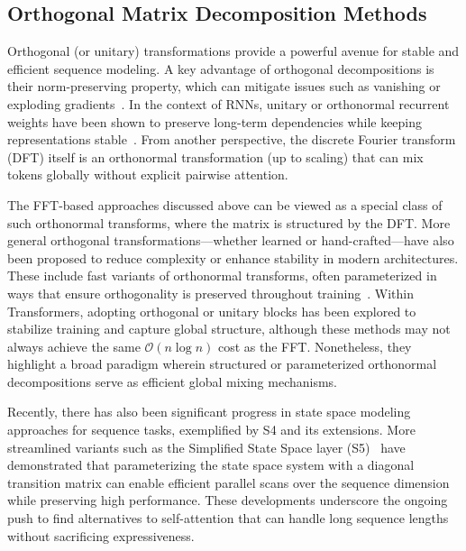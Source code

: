 \subsection{Orthogonal Matrix Decomposition Methods}
\label{subsec:orthogonal_decompositions}
Orthogonal (or unitary) transformations provide a powerful avenue for stable and efficient sequence modeling. A key advantage of orthogonal decompositions is their norm-preserving property, which can mitigate issues such as vanishing or exploding gradients~\cite{wisdom2016full}. In the context of RNNs, unitary or orthonormal recurrent weights have been shown to preserve long-term dependencies while keeping representations stable~\cite{arjovsky2016unitary,lezcano2019cheap}. From another perspective, the discrete Fourier transform (DFT) itself is an orthonormal transformation (up to scaling) that can mix tokens globally without explicit pairwise attention.

The FFT-based approaches discussed above can be viewed as a special class of such orthonormal transforms, where the matrix is structured by the DFT. More general orthogonal transformations---whether learned or hand-crafted---have also been proposed to reduce complexity or enhance stability in modern architectures. These include fast variants of orthonormal transforms, often parameterized in ways that ensure orthogonality is preserved throughout training~\cite{lezcano2019cheap}. Within Transformers, adopting orthogonal or unitary blocks has been explored to stabilize training and capture global structure, although these methods may not always achieve the same \(\mathcal{O}(n \log n)\) cost as the FFT. Nonetheless, they highlight a broad paradigm wherein structured or parameterized orthonormal decompositions serve as efficient global mixing mechanisms.

Recently, there has also been significant progress in state space modeling approaches for sequence tasks, exemplified by S4 and its extensions. More streamlined variants such as the Simplified State Space layer (S5)~\cite{smith2023simplifiedstatespacelayers} have demonstrated that parameterizing the state space system with a diagonal transition matrix can enable efficient parallel scans over the sequence dimension while preserving high performance. These developments underscore the ongoing push to find alternatives to self-attention that can handle long sequence lengths without sacrificing expressiveness.

